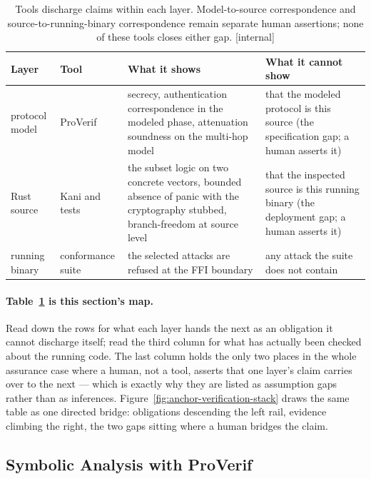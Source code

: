 \documentclass[11pt,a4paper]{article}
\theoremstyle{definition}
\begin{document}
\begin{table}[H]
\centering
\caption{Tools discharge claims within each layer. Model-to-source correspondence and source-to-running-binary correspondence remain separate human assertions; none of these tools closes either gap. [internal]}
\label{tab:anchor-verification-stack}
\small
\renewcommand{\arraystretch}{1.15}
\begin{tabularx}{\linewidth}{@{}l l >{\raggedright\arraybackslash}X >{\raggedright\arraybackslash}X@{}}
\toprule
\textbf{Layer} & \textbf{Tool} & \textbf{What it shows} & \textbf{What it cannot show} \\
\midrule
protocol model & ProVerif & secrecy, authentication correspondence in the modeled phase, attenuation soundness on the multi-hop model & that the modeled protocol is this source (the specification gap; a human asserts it) \\
Rust source & Kani and tests & the subset logic on two concrete vectors, bounded absence of panic with the cryptography stubbed, branch-freedom at source level & that the inspected source is this running binary (the deployment gap; a human asserts it) \\
running binary & conformance suite & the selected attacks are refused at the FFI boundary & any attack the suite does not contain \\
\bottomrule
\end{tabularx}
\end{table}

\paragraph{Table~\ref{tab:anchor-verification-stack} is this section's map.} Read down the rows for what each layer hands the next as an obligation it cannot discharge itself; read the third column for what has actually been checked about the running code. The last column holds the only two places in the whole assurance case where a human, not a tool, asserts that one layer's claim carries over to the next --- which is exactly why they are listed as assumption gaps rather than as inferences. Figure~\ref{fig:anchor-verification-stack} draws the same table as one directed bridge: obligations descending the left rail, evidence climbing the right, the two gaps sitting where a human bridges the claim.



\subsection{Symbolic Analysis with ProVerif}
\end{document}
